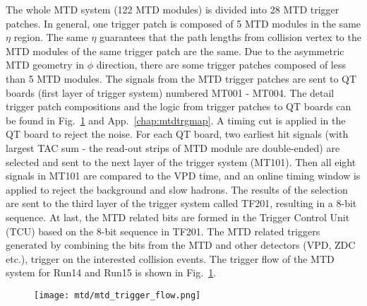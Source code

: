 The whole MTD system (122 MTD modules) is divided into 28 MTD trigger patches. In general, one trigger patch is composed of 5 MTD modules in the same $\eta$ region. The same $\eta$ guarantees that the path lengths from collision vertex to the MTD modules of the same trigger patch are the same. Due to the asymmetric MTD geometry in $\phi$ direction, there are some trigger patches composed of less than 5 MTD modules. The signals from the MTD trigger patches are sent to QT boards (first layer of trigger system) numbered MT001 - MT004. The detail trigger patch compositions and the logic from trigger patches to QT boards can be found in Fig.~\ref{mtdtrgflow} and App.~\ref{chap:mtdtrgmap}. A timing cut is applied in the QT board to reject the noise. For each QT board, two earliest hit signals (with largest TAC sum - the read-out strips of MTD module are double-ended) are selected and sent to the next layer of the trigger system (MT101). Then all eight signals in MT101 are compared to the VPD time, and an online timing window is applied to reject the background and slow hadrons. The results of the selection are sent to the third layer of the trigger system called TF201, resulting in a 8-bit sequence. At last, the MTD related bits are formed in the Trigger Control Unit (TCU) based on the 8-bit sequence in TF201. The MTD related triggers generated by combining the bits from the MTD and other detectors (VPD, ZDC etc.), trigger on the interested collision events. The trigger flow of the MTD system for Run14 and Run15 is shown in Fig.~\ref{mtdtrgflow}. 

\begin{figure}[htbp]
\centering
\texttt{[image: mtd/mtd\_trigger\_flow.png]}
 \label{mtdtrgflow}
\end{figure}

